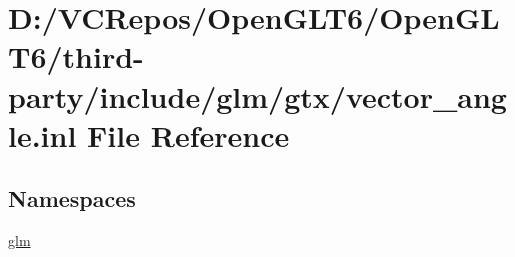 \hypertarget{vector__angle_8inl}{}\section{D\+:/\+V\+C\+Repos/\+Open\+G\+L\+T6/\+Open\+G\+L\+T6/third-\/party/include/glm/gtx/vector\+\_\+angle.inl File Reference}
\label{vector__angle_8inl}
\subsection*{Namespaces}
\begin{DoxyCompactItemize}
\item 
 \mbox{\hyperlink{namespaceglm}{glm}}
\end{DoxyCompactItemize}
